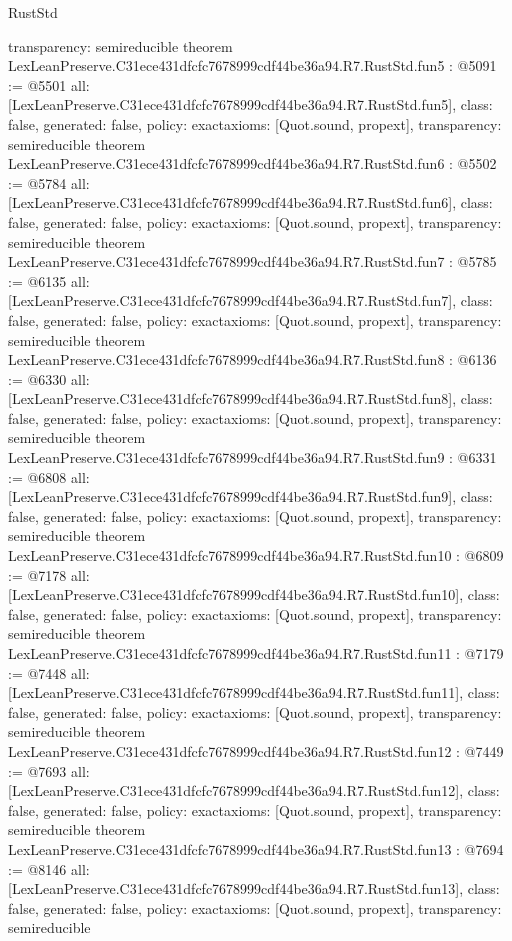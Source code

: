 \begin{lexlean}{RustStd}
\begin{coremodule}
{  transparency: semireducible
}
theorem LexLeanPreserve.C31ece431dfcfc7678999cdf44be36a94.R7.RustStd.fun5 : @5091 := @5501 {
  all: [LexLeanPreserve.C31ece431dfcfc7678999cdf44be36a94.R7.RustStd.fun5],
  class: false,
  generated: false,
  policy: exact{axioms: [Quot.sound, propext]},
  transparency: semireducible
}
theorem LexLeanPreserve.C31ece431dfcfc7678999cdf44be36a94.R7.RustStd.fun6 : @5502 := @5784 {
  all: [LexLeanPreserve.C31ece431dfcfc7678999cdf44be36a94.R7.RustStd.fun6],
  class: false,
  generated: false,
  policy: exact{axioms: [Quot.sound, propext]},
  transparency: semireducible
}
theorem LexLeanPreserve.C31ece431dfcfc7678999cdf44be36a94.R7.RustStd.fun7 : @5785 := @6135 {
  all: [LexLeanPreserve.C31ece431dfcfc7678999cdf44be36a94.R7.RustStd.fun7],
  class: false,
  generated: false,
  policy: exact{axioms: [Quot.sound, propext]},
  transparency: semireducible
}
theorem LexLeanPreserve.C31ece431dfcfc7678999cdf44be36a94.R7.RustStd.fun8 : @6136 := @6330 {
  all: [LexLeanPreserve.C31ece431dfcfc7678999cdf44be36a94.R7.RustStd.fun8],
  class: false,
  generated: false,
  policy: exact{axioms: [Quot.sound, propext]},
  transparency: semireducible
}
theorem LexLeanPreserve.C31ece431dfcfc7678999cdf44be36a94.R7.RustStd.fun9 : @6331 := @6808 {
  all: [LexLeanPreserve.C31ece431dfcfc7678999cdf44be36a94.R7.RustStd.fun9],
  class: false,
  generated: false,
  policy: exact{axioms: [Quot.sound, propext]},
  transparency: semireducible
}
theorem LexLeanPreserve.C31ece431dfcfc7678999cdf44be36a94.R7.RustStd.fun10 : @6809 := @7178 {
  all: [LexLeanPreserve.C31ece431dfcfc7678999cdf44be36a94.R7.RustStd.fun10],
  class: false,
  generated: false,
  policy: exact{axioms: [Quot.sound, propext]},
  transparency: semireducible
}
theorem LexLeanPreserve.C31ece431dfcfc7678999cdf44be36a94.R7.RustStd.fun11 : @7179 := @7448 {
  all: [LexLeanPreserve.C31ece431dfcfc7678999cdf44be36a94.R7.RustStd.fun11],
  class: false,
  generated: false,
  policy: exact{axioms: [Quot.sound, propext]},
  transparency: semireducible
}
theorem LexLeanPreserve.C31ece431dfcfc7678999cdf44be36a94.R7.RustStd.fun12 : @7449 := @7693 {
  all: [LexLeanPreserve.C31ece431dfcfc7678999cdf44be36a94.R7.RustStd.fun12],
  class: false,
  generated: false,
  policy: exact{axioms: [Quot.sound, propext]},
  transparency: semireducible
}
theorem LexLeanPreserve.C31ece431dfcfc7678999cdf44be36a94.R7.RustStd.fun13 : @7694 := @8146 {
  all: [LexLeanPreserve.C31ece431dfcfc7678999cdf44be36a94.R7.RustStd.fun13],
  class: false,
  generated: false,
  policy: exact{axioms: [Quot.sound, propext]},
  transparency: semireducible
}
\end{coremodule}
\end{lexlean}
